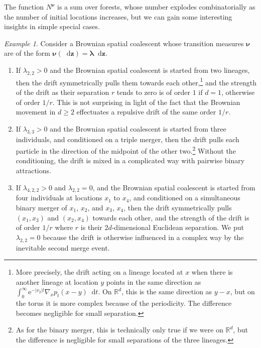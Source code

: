 \documentclass[reqno,draft]{amsart}
\numberwithin{equation}{section}
\theoremstyle{plain}
\theoremstyle{remark}
\newtheorem{example}[theorem]{Example}
\newcommand{\R}{\mathbb{R}} %
\newcommand*\diff{\mathop{}\!\mathrm{d}}
\newcommand{\e}{\mathrm{e}}
\newcommand{\nut}[1]{|\nu_{#1}|}
\begin{document}
The function $N^{\boldsymbol \nu}$ is a sum over forests, whose number explodes combinatorially as the number of initial locations increases, but we can gain some interesting insights in simple special cases.
\begin{example}\label{ex:driftintro}
    Consider a Brownian spatial coalescent whose transition measures $\boldsymbol \nu$ are of the form $\boldsymbol \nu(\diff \boldsymbol z) = \boldsymbol \lambda \diff \boldsymbol z$.
    \begin{enumerate}
        \item If $\lambda_{2,2} > 0$ and the Brownian spatial coalescent is started from two lineages, then the drift symmetrically pulls them towards each other,\footnote{%
                More precisely, the drift acting on a lineage located at $x$ when there is another lineage at location $y$ points in the same direction as $\int_0^\infty \e^{-\nut{2} t}\nabla _x p_t(x-y) \diff t$. On $\R^d$, this is the same direction as $y-x$, but on the torus it is more complex because of the periodicity. The difference becomes negligible for small separation.%
            }
            and the strength of the drift as their separation $r$ tends to zero is of order $1$ if $d = 1$, otherwise of order $1 / r$. This is not surprising in light of the fact that the Brownian movement in $d \ge 2$ effectuates a repulsive drift of the same order $1 / r$.
        \item If $\lambda_{3,3} > 0$ and the Brownian spatial coalescent is started from three individuals, and conditioned on a triple merger, then the drift pulls each particle in the direction of the midpoint of the other two.\footnote{As for the binary merger, this is technically only true if we were on $\R^d$, but the difference is negligible for small separations of the three lineages.} Without the conditioning, the drift is mixed in a complicated way with pairwise binary attractions.
        \item If $\lambda_{4,2,2} > 0$ and $\lambda_{2,2} = 0$, and the Brownian spatial coalescent is started from four individuals at locations $x_1$ to $x_4$, and conditioned on a simultaneous binary merger of $x_1$, $x_2$, and $x_3$, $x_4$, then the drift symmetrically pulls $(x_1,x_3)$ and $(x_2,x_4)$ towards each other, and the strength of the drift is of order $1 / r$ where $r$ is their $2d$-dimensional Euclidean separation. We put $\lambda_{2,2} = 0$ because the drift is otherwise influenced in a complex way by the inevitable second merge event.
    \end{enumerate}
\end{example}
\end{document}
